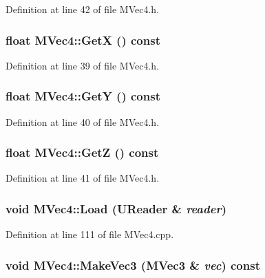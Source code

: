 Definition at line 42 of file MVec4.h.\hypertarget{class_m_vec4_18e1347de288266430d0a8933b563f44}{
\subsubsection[{GetX}]{\setlength{\rightskip}{0pt plus 5cm}float MVec4::GetX () const}}
\label{class_m_vec4_18e1347de288266430d0a8933b563f44}




Definition at line 39 of file MVec4.h.\hypertarget{class_m_vec4_1b2b8689c61873feecf0622252cb5dcc}{
\subsubsection[{GetY}]{\setlength{\rightskip}{0pt plus 5cm}float MVec4::GetY () const}}
\label{class_m_vec4_1b2b8689c61873feecf0622252cb5dcc}




Definition at line 40 of file MVec4.h.\hypertarget{class_m_vec4_99ab5835f6f8d1ce2ed33532e646bd74}{
\subsubsection[{GetZ}]{\setlength{\rightskip}{0pt plus 5cm}float MVec4::GetZ () const}}
\label{class_m_vec4_99ab5835f6f8d1ce2ed33532e646bd74}




Definition at line 41 of file MVec4.h.\hypertarget{class_m_vec4_127235386d5e713c55e9ff7f9e0f2afc}{
\subsubsection[{Load}]{\setlength{\rightskip}{0pt plus 5cm}void MVec4::Load ({\bf UReader} \& {\em reader})}}
\label{class_m_vec4_127235386d5e713c55e9ff7f9e0f2afc}




Definition at line 111 of file MVec4.cpp.\hypertarget{class_m_vec4_47d87a65186a68fe49dce64572bb0f77}{
\subsubsection[{MakeVec3}]{\setlength{\rightskip}{0pt plus 5cm}void MVec4::MakeVec3 ({\bf MVec3} \& {\em vec}) const}}
\label{class_m_vec4_47d87a65186a68fe49dce64572bb0f77}




